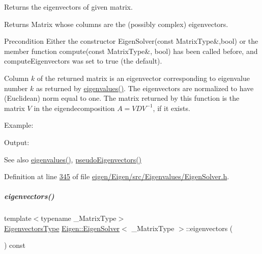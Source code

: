 Returns the eigenvectors of given matrix. 

\begin{DoxyReturn}{Returns}
Matrix whose columns are the (possibly complex) eigenvectors.
\end{DoxyReturn}
\begin{DoxyPrecond}{Precondition}
Either the constructor Eigen\+Solver(const Matrix\+Type\&,bool) or the member function compute(const Matrix\+Type\&, bool) has been called before, and {\ttfamily compute\+Eigenvectors} was set to true (the default).
\end{DoxyPrecond}
Column $ k $ of the returned matrix is an eigenvector corresponding to eigenvalue number $ k $ as returned by \hyperlink{group___eigenvalues___module_a114189009e42f5e03372a7a3dfa33b97}{eigenvalues()}. The eigenvectors are normalized to have (Euclidean) norm equal to one. The matrix returned by this function is the matrix $ V $ in the eigendecomposition $ A = V D V^{-1} $, if it exists.

Example\+: 
\begin{DoxyCodeInclude}
\end{DoxyCodeInclude}
 Output\+: 
\begin{DoxyVerbInclude}
\end{DoxyVerbInclude}


\begin{DoxySeeAlso}{See also}
\hyperlink{group___eigenvalues___module_a114189009e42f5e03372a7a3dfa33b97}{eigenvalues()}, \hyperlink{group___eigenvalues___module_a4e796226f06e1f7347cf03a38755a155}{pseudo\+Eigenvectors()} 
\end{DoxySeeAlso}


Definition at line \hyperlink{eigen_2_eigen_2src_2_eigenvalues_2_eigen_solver_8h_source_l00345}{345} of file \hyperlink{eigen_2_eigen_2src_2_eigenvalues_2_eigen_solver_8h_source}{eigen/\+Eigen/src/\+Eigenvalues/\+Eigen\+Solver.\+h}.

\mbox{\label{group___eigenvalues___module_a0d6a1827def804c4b873679bdff6615a}} 
\subparagraph{\texorpdfstring{eigenvectors()}{eigenvectors()}\hspace{0.1cm}{\footnotesize\ttfamily [2/2]}}
{\footnotesize\ttfamily template$<$typename \+\_\+\+Matrix\+Type$>$ \\
\hyperlink{group___eigenvalues___module_aa140354e2f7d5ce34c6488c39e19f2c2}{Eigenvectors\+Type} \hyperlink{group___eigenvalues___module_class_eigen_1_1_eigen_solver}{Eigen\+::\+Eigen\+Solver}$<$ \+\_\+\+Matrix\+Type $>$\+::eigenvectors (\begin{DoxyParamCaption}{ }\end{DoxyParamCaption}) const}



